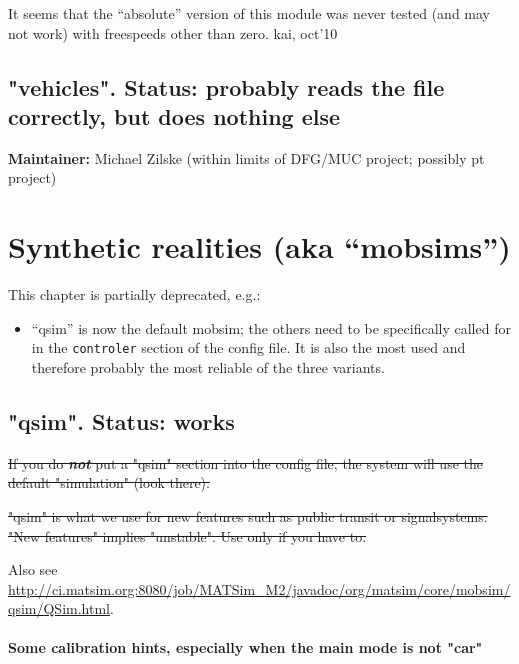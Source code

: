 It  seems that the ``absolute'' version of this module was never tested (and  may not work) with freespeeds other than zero. kai, oct'10



\umbruch
\section{"vehicles". Status: probably reads the file correctly, but does nothing else}

\textbf{Maintainer:} Michael Zilske (within limits of DFG/MUC project; possibly pt project)

\umbruch
\chapter{Synthetic realities (aka ``mobsims'')}

This chapter is partially deprecated, e.g.:
\begin{itemize}
\item
``qsim'' is now the default mobsim; the others need to be specifically
called for in the \verb$controler$ section of the config file.  It is also the most used and therefore probably the most reliable of the three variants.
\end{itemize}


\section{"qsim". Status: works}

\sout{If you do \textbf{\emph{not}} put a "qsim" section into the config file, the system will use the default "simulation" (look there).}

\sout{"qsim"  is what we use for new features such as public transit or  signalsystems. "New features" implies "unstable". Use only  if you have to.}

Also see \url{http://ci.matsim.org:8080/job/MATSim_M2/javadoc/org/matsim/core/mobsim/qsim/QSim.html}.

\subsubsection{Some calibration hints, especially when the main mode is not "car"}

